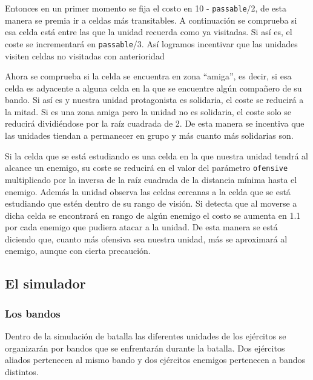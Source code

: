 Entonces en un primer momento se fija el costo en 10 - \verb|passable|/2, de esta manera se premia ir a celdas más transitables. A continuación se comprueba si esa celda está entre las que la unidad recuerda como ya visitadas. Si así es, el coste se incrementará en \verb|passable|/3. Así logramos incentivar que las unidades visiten celdas no visitadas con anterioridad  
  
Ahora se comprueba si la celda se encuentra en zona ``amiga'', es decir, si esa celda es adyacente a alguna celda en la que se encuentre algún compañero de su bando. Si así es y nuestra unidad protagonista es solidaria, el coste se reducirá a la mitad. Si es una zona amiga pero la unidad no es solidaria, el coste solo se reducirá dividiéndose por la raíz cuadrada de 2. De esta manera se incentiva que las unidades tiendan a permanecer en grupo y más cuanto más solidarias son.

Si la celda que se est\'a estudiando es una celda en la que nuestra unidad tendr\'a al alcance un enemigo, su coste se reducir\'a en el valor del par\'ametro \verb|ofensive|  multiplicado por la inversa de la ra\'iz cuadrada de la distancia m\'inima hasta el enemigo. Adem\'as la unidad observa las celdas cercanas a la celda que se est\'a estudiando que est\'en dentro de su rango de visi\'on. Si detecta que al moverse a dicha celda se encontrar\'a en rango de alg\'un enemigo el costo se aumenta en 1.1 por cada enemigo que pudiera atacar a la unidad. De esta manera se est\'a diciendo que, cuanto m\'as ofensiva sea nuestra unidad, m\'as se aproximar\'a al enemigo, aunque con cierta precauci\'on.  

\subsection{El simulador}

\subsubsection{Los bandos}

Dentro de la simulaci\'on de batalla las diferentes unidades de los ej\'ercitos  se organizar\'an por bandos que se enfrentar\'an durante la batalla. Dos ej\'ercitos aliados pertenecen al mismo bando y dos ej\'ercitos enemigos pertenecen a bandos distintos.

